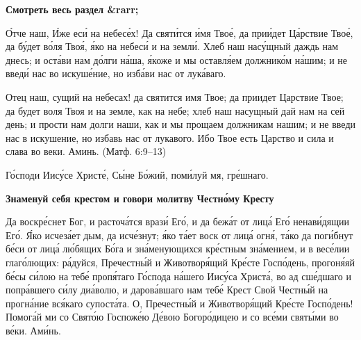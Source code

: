 




\bfseries Смотреть весь раздел &rarr;\normalfont{} 





О́тче наш, И́же еси́ на небесе́х! Да святи́тся и́мя Твое́, да прии́дет Ца́рствие
Твое́, да бу́дет во́ля Твоя́, я́ко на небеси́ и на земли́. Хлеб наш насу́щный
даждь нам днесь; и оста́ви нам до́лги на́ша, я́коже и мы оставля́ем
должнико́м на́шим; и не введи́ нас во искуше́ние, но изба́ви нас от
лука́ваго.


   Отец наш, сущий на небесах! да святится имя Твое; да приидет Царствие
Твое; да будет воля Твоя и на земле, как на небе; хлеб наш насущный
дай нам на сей день; и прости нам долги наши, как и мы прощаем
должникам нашим; и не введи нас в искушение, но избавь нас от
лукавого. Ибо Твое есть Царство и сила и слава во веки. Аминь. (Матф.
6:9–13)

   


\mychapterending





Го́споди Иису́се Христе́, Сы́не Бо́жий, поми́луй мя, гре́шнаго.

   


\mychapterending







\bfseries Знаменуй себя крестом и говори молитву Честно́му Кресту\normalfont{}


   Да воскре́снет Бог, и расточа́тся врази́ Его́, и да бежа́т от лица́ Его́
ненави́дящии Его́. Я́ко исчеза́ет дым, да исче́знут; я́ко та́ет воск от лица́
огня́, та́ко да поги́бнут бе́си от лица́ лю́бящих Бо́га и зна́менующихся
кре́стным зна́мением, и в весе́лии глаго́лющих: ра́дуйся, Пречестны́й и
Животворя́щий Кре́сте Госпо́день, прогоня́яй бе́сы си́лою на тебе́ пропя́таго
Го́спода на́шего Иису́са Христа́, во ад сше́дшаго и попра́вшего си́лу диа́волю,
и дарова́вшаго нам тебе́ Крест Свой Честны́й на прогна́ние вся́каго
супоста́та. О, Пречестны́й и Животворя́щий Кре́сте Госпо́день! Помога́й ми
со Свято́ю Госпоже́ю Де́вою Богоро́дицею и со все́ми святы́ми во ве́ки.
Ами́нь.


